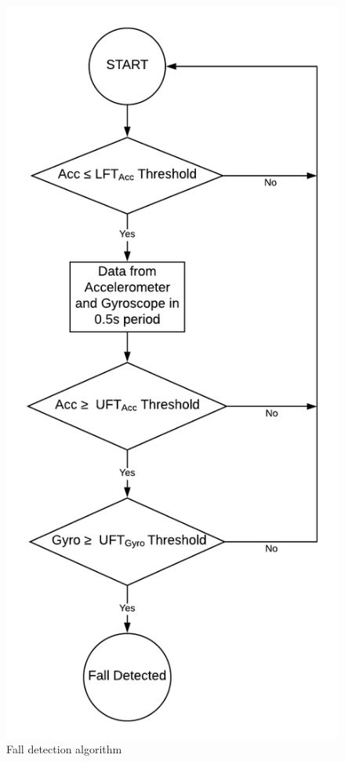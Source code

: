\documentclass[letterpaper,12pt,titlepage,oneside,final]{book}
\let\origdoublepage\cleardoublepage
\newcommand{\clearemptydoublepage}{%
	\clearpage{\pagestyle{empty}\origdoublepage}}
\let\cleardoublepage\clearemptydoublepage
\begin{document}
\begin{figure}
	\centering
	\includegraphics[scale=0.8]{algorithm_diagram}
	\caption{Fall detection algorithm}
\end{figure}
\cleardoublepage
\end{document}
